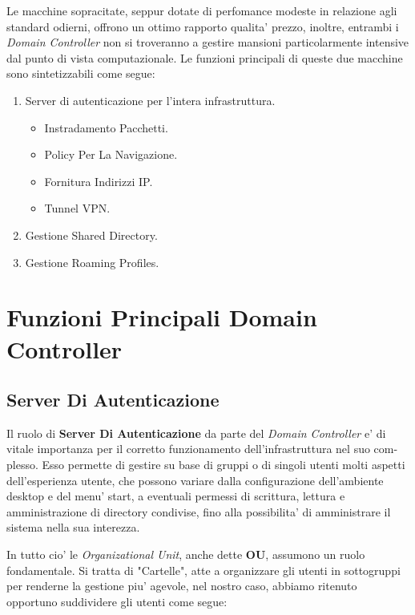 \documentclass{report}
\begin{document}
			Le macchine sopracitate, seppur dotate di perfomance modeste in relazione agli standard odierni, offrono un ottimo 
			rapporto qualita' prezzo, inoltre, entrambi i \emph{Domain Controller} non si troveranno a gestire mansioni 
			particolarmente intensive dal punto di vista computazionale.
			Le funzioni principali di queste due macchine sono sintetizzabili come segue:
			\begin{enumerate}
				\item Server di autenticazione per l'intera infrastruttura.
					\begin{itemize}
						\item Instradamento Pacchetti.
						\item Policy Per La Navigazione.
						\item Fornitura Indirizzi IP.
						\item Tunnel VPN.
					\end{itemize}
				\item Gestione Shared Directory.
				\item Gestione Roaming Profiles.
			\end{enumerate}
		\section{Funzioni Principali Domain Controller}
			\subsection{Server Di Autenticazione}
				Il ruolo di \textbf{Server Di Autenticazione} da parte del \emph{Domain Controller} e' di vitale importanza
				per il corretto funzionamento dell'infrastruttura nel suo com-\\plesso. Esso permette di gestire su base di 
				gruppi o di singoli utenti molti aspetti dell'esperienza utente, che possono variare dalla configurazione
				dell'ambiente desktop e del menu' start, a eventuali permessi di scrittura, lettura e amministrazione di
				directory condivise, fino alla possibilita' di amministrare il sistema nella sua interezza.

				In tutto cio' le \emph{Organizational Unit}, anche dette \textbf{OU}, assumono un ruolo fondamentale. Si 
				tratta di "Cartelle", atte a organizzare gli utenti in sottogruppi per renderne la gestione piu' agevole,
				nel nostro caso, abbiamo ritenuto opportuno suddividere gli utenti come segue:
\end{document}
